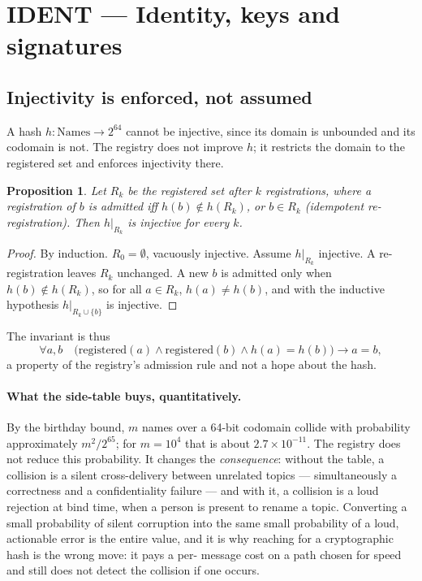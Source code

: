 \documentclass[11pt]{article}
\newtheorem{prop}{Proposition}[section]
\begin{document}
\section{IDENT --- Identity, keys and signatures}

\subsection{Injectivity is enforced, not assumed}
\label{lbl:HS-IDENT-01}

A hash $h : \mathrm{Names} \to 2^{64}$ cannot be injective, since its domain is
unbounded and its codomain is not. The registry does not improve $h$; it
restricts the domain to the registered set and enforces injectivity there.

\begin{prop}
Let $R_k$ be the registered set after $k$ registrations, where a registration
of $b$ is admitted iff $h(b) \notin h(R_k)$, or $b \in R_k$ (idempotent
re-registration). Then $h|_{R_k}$ is injective for every $k$.
\end{prop}

\begin{proof}
By induction. $R_0 = \emptyset$, vacuously injective. Assume $h|_{R_k}$
injective. A re-registration leaves $R_k$ unchanged. A new $b$ is admitted only
when $h(b) \notin h(R_k)$, so for all $a \in R_k$, $h(a) \neq h(b)$, and with
the inductive hypothesis $h|_{R_k \cup \{b\}}$ is injective.
\end{proof}

The invariant is thus
\begin{equation}
\forall a, b \quad \big(\mathrm{registered}(a) \wedge \mathrm{registered}(b)
\wedge h(a) = h(b)\big) \rightarrow a = b,
\end{equation}
a property of the registry's admission rule and not a hope about the hash.

\paragraph{What the side-table buys, quantitatively.} By the birthday bound,
$m$ names over a 64-bit codomain collide with probability approximately
$m^2 / 2^{65}$; for $m = 10^4$ that is about $2.7 \times 10^{-11}$. The
registry does not reduce this probability. It changes the \emph{consequence}:
without the table, a collision is a silent cross-delivery between unrelated
topics --- simultaneously a correctness and a confidentiality failure --- and
with it, a collision is a loud rejection at bind time, when a person is present
to rename a topic. Converting a small probability of silent corruption into the
same small probability of a loud, actionable error is the entire value, and it
is why reaching for a cryptographic hash is the wrong move: it pays a per-
message cost on a path chosen for speed and still does not detect the collision
if one occurs.
\end{document}
